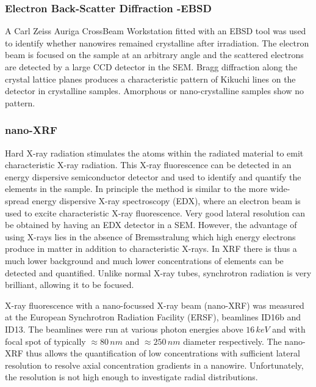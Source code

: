 \subsubsection{Electron Back-Scatter Diffraction -EBSD}

A Carl Zeiss Auriga CrossBeam Workstation fitted with an EBSD tool was used to identify whether nanowires remained crystalline after irradiation. The electron beam is focused on the sample at an arbitrary angle and the scattered electrons are detected by a large CCD detector in the SEM. Bragg diffraction along the crystal lattice planes produces a characteristic pattern of Kikuchi lines on the detector \cite{kikuchi_diffraction_1928,fultz_transmission_2013} in crystalline samples. Amorphous or nano-crystalline samples show no pattern.

\subsubsection{nano-XRF}

Hard X-ray radiation stimulates the atoms within the radiated material to emit characteristic X-ray radiation. This X-ray fluorescence can be detected in an energy dispersive semiconductor detector and used to identify and quantify the elements in the sample. In principle the method is similar to the more wide-spread energy dispersive X-ray spectroscopy (EDX), where an electron beam is used to excite characteristic X-ray fluorescence. Very good lateral resolution can be obtained by having an EDX detector in a SEM. However, the advantage of using X-rays lies in the absence of Bremsstralung which high energy electrons produce in matter in addition to characteristic X-rays. In XRF there is thus a much lower background and much lower concentrations of elements can be detected and quantified. Unlike normal X-ray tubes, synchrotron radiation is very brilliant, allowing it to be focused. 

X-ray fluorescence with a nano-focussed X-ray beam (nano-XRF) was measured at the European Synchrotron Radiation Facility (ERSF), beamlines ID16b and ID13. The beamlines were run at various photon energies above $16\,keV$ and with focal spot of typically $\approx 80\,nm$ and $\approx 250\,nm$ diameter respectively. The nano-XRF thus allows the quantification of low concentrations with sufficient lateral resolution to resolve axial concentration gradients in a nanowire. Unfortunately, the resolution is not high enough to investigate radial distributions. 

